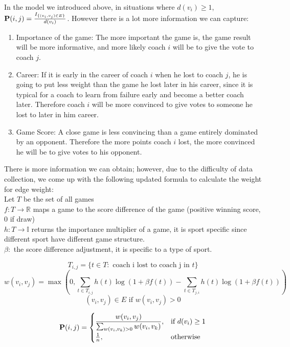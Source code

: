 \documentclass[11pt,notitlepage]{article}
\begin{document}
\noindent In the model we introduced above, in situations where $d(v_i) \geq 1$, ${\bf P}(i, j) = \frac{ I_{\{(v_i, v_j) \in E\}}}{d(v_i)}$. However there is a lot more information we can capture:

\begin{enumerate}
\item Importance of the game: The more important the game is, the game result will be more informative, and more likely coach $i$ will be to give the vote to coach $j$.
\item Career: If it is early in the career of coach $i$ when he lost to coach $j$, he is going to put less weight than the game he lost later in his career, since it is typical for a coach to learn from failure early and become a better coach later. Therefore coach $i$ will be more convinced to give votes to someone he lost to later in him career.
\item Game Score: A close game is less convincing than a game entirely dominated by an opponent. Therefore the more points coach $i$ lost, the more convinced he will be to give votes to his opponent.
\end{enumerate}

\noindent There is more information we can obtain; however, due to the difficulty of data collection, we come up with the following updated formula to calculate the weight for edge weight:
\\

\noindent Let $T$ be the set of all games
\\
$f: T \rightarrow \mathbb{R}$ maps a game to the score difference of the game (positive winning score, 0 if draw)
\\
$h: T \rightarrow \mathbb{I}$ returns the importance multiplier of a game, it is sport specific since different sport have different game structure.
\\
$\beta: $ the score difference adjustment, it is specific to a type of sport.

$$ T_{i,j} = \{t \in T : \mbox{ coach i lost to coach j in } t\} $$
$$w(v_i, v_j) =  \max(0, \sum_{t \in T_{i, j}} h(t) \log(1 + \beta f(t)) - \sum_{t \in T_{j, i}} h(t) \log(1 + \beta f(t))) $$
$$(v_i, v_j) \in E \mbox{ if } w(v_i, v_j) > 0$$

\[
    {\bf P}(i, j)= 
\begin{cases}
    \dfrac{w(v_i, v_j)}{\sum_{w(v_i, v_k) > 0} w(v_i, v_k)},      & \text{if } d(v_i) \geq 1\\
    \frac{1}{n},              & \text{otherwise}
\end{cases}
\]
\\
\end{document}
